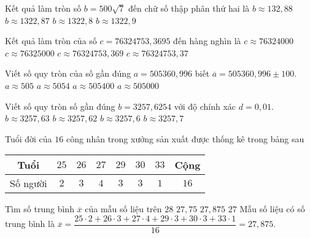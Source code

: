 
\begin{ex}%
	Kết quả làm tròn số $b=500\sqrt{7}$ đến chữ số thập phân thứ hai là
	\choice
	{\True $b\approx 132,88$}
	{$b\approx 1322,87$}
	{$b\approx 1322,8 $}
	{$b\approx 1322,9 $}
\end{ex}

\begin{ex}%
	Kết quả làm tròn của số $c=76324753{,}3695$ đến  hàng nghìn là
	\choice
	{$c\approx 76324000$}
	{\True $c\approx 76325000$}
	{$c\approx 76324753{,}369$}
	{$c\approx 76324753{,}37$}
\end{ex}

\begin{ex}%
	Viết số quy tròn của số gần đúng $a=505360{,}996$ biết $\overline{a}=505360{,}996\pm 100$.
	\choice
	{$a\approx 505$}
	{$a\approx 5054$}
	{$a\approx 505400$}
	{\True $a\approx 505000$}
\end{ex}

\begin{ex}%
	Viết số quy tròn số gần đúng $b=3257{,}6254$ với độ chính xác $d=0{,}01$.
	\choice
	{$b\approx 3257{,}63$}
	{$b\approx 3257{,}62$}
	{\True $b\approx 3257{,}6$}
	{$b\approx 3257{,}7$}
\end{ex}


\begin{ex}%
	Tuổi đời của $16$ công nhân trong xưởng sản xuất được thống kê trong bảng sau
	\begin{center}
		\begin{tabular}{|c|c|c|c|c|c|c|c|}
		\hline 
		Tuổi & $25$ & $26$ & $27$ & $29$ & $30$ & $33$ & Cộng \\
		\hline
		Số người & $2$ & $3$ & $4$ & $3$ & $3$ & $1$ & $16$ \\ 
		\hline
		\end{tabular}
	\end{center}
Tìm số trung bình $\overline{x}$ của mẫu số liệu trên
	\choice
	{$28$}
	{$27{,}75$}
	{\True $27{,}875$}
	{$27$}
	\loigiai
	{
		Mẫu số liệu có số trung bình là $\overline{x}=\dfrac{25\cdot 2+26\cdot 3+27\cdot 4+29\cdot 3+30\cdot 3+33\cdot 1}{16}=27{,}875$.
	}
\end{ex}

